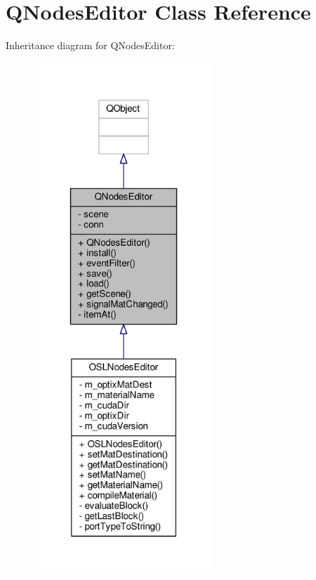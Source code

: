 \hypertarget{class_q_nodes_editor}{\section{Q\-Nodes\-Editor Class Reference}
\label{class_q_nodes_editor}
}


Inheritance diagram for Q\-Nodes\-Editor\-:
\nopagebreak
\begin{figure}[H]
\begin{center}
\leavevmode
\includegraphics[width=192pt]{class_q_nodes_editor__inherit__graph}
\end{center}
\end{figure}


